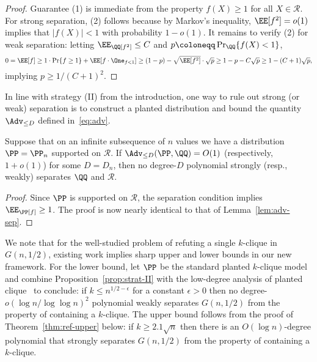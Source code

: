 \documentclass{article}
\begin{document}
\begin{proof}
Guarantee (1) is immediate from the property $f(X) \ge 1$ for all $X \in \mathcal{R}$. For strong separation, (2) follows because by Markov's inequality, $\EE[f^2] = o(1)$ implies that $|f(X)| < 1$ with probability $1-o(1)$. It remains to verify (2) for weak separation: letting $\EE_\QQ[f^2] \le C$ and $p \coloneqq \Pr_\QQ\{f(X) < 1\}$,
\[ 0 = \EE[f] \ge 1 \cdot \Pr\{f \ge 1\} + \EE[f \cdot \One_{f < 1}] \ge (1-p) - \sqrt{\EE[f^2]} \cdot \sqrt{p} \ge 1-p-C\sqrt{p} \ge 1 - (C+1)\sqrt{p}, \]
implying $p \ge 1/(C+1)^2$.
\end{proof}

In line with strategy (II) from the introduction, one way to rule out strong (or weak) separation is to construct a planted distribution and bound the quantity $\Adv_{\le D}$ defined in~\eqref{eq:adv}.

\begin{proposition}\label{prop:strat-II}
Suppose that on an infinite subsequence of $n$ values we have a distribution $\PP = \PP_n$ supported on $\mathcal{R}$. If $\Adv_{\le D}(\PP,\QQ) = O(1)$ (respectively, $1+o(1)$) for some $D = D_n$, then no degree-$D$ polynomial strongly (resp., weakly) separates $\QQ$ and $\mathcal{R}$.
\end{proposition}

\begin{proof}
Since $\PP$ is supported on $\mathcal{R}$, the separation condition implies $\EE_\PP[f] \ge 1$. The proof is now nearly identical to that of Lemma~\ref{lem:adv-sep}.
\end{proof}


\begin{remark}
We note that for the well-studied problem of refuting a single $k$-clique in $G(n,1/2)$, existing work implies sharp upper and lower bounds in our new framework. For the lower bound, let $\PP$ be the standard planted $k$-clique model and combine Proposition~\ref{prop:strat-II} with the low-degree analysis of planted clique~\cite[Section~2.4]{hopkins-thesis} to conclude: if $k \le n^{1/2-\epsilon}$ for a constant $\epsilon > 0$ then no degree-$o(\log n/\log \log n)^2$ polynomial weakly separates $G(n,1/2)$ from the property of containing a $k$-clique. The upper bound follows from the proof of Theorem~\ref{thm:ref-upper} below: if $k \ge 2.1 \sqrt{n}$ then there is an $O(\log n)$-degree polynomial that strongly separates $G(n,1/2)$ from the property of containing a $k$-clique.
\end{remark}
\end{document}
